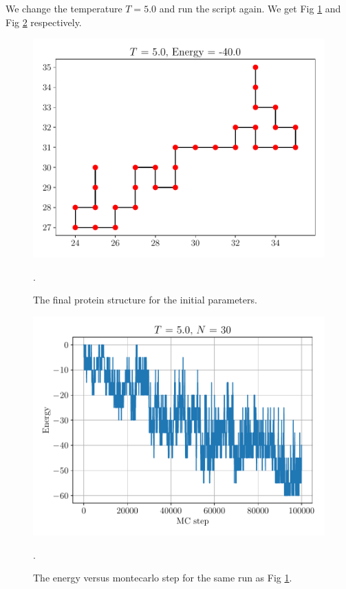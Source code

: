 \documentclass{article}
\begin{document}
We change the temperature $T =5.0$ and run the script again. We get Fig \ref{fig:q3a_protein5} and Fig \ref{fig:q3a_energy5} respectively. 
\begin{figure}[h!]
    \centerline{\includegraphics[scale=0.6]{images/Q3a_final_protein_T50_N30_n100000.pdf}}
    \caption{The final protein structure for the initial parameters. }.
    \label{fig:q3a_protein5}
\end{figure}
\begin{figure}[h!]
    \centerline{\includegraphics[scale=0.6]{images/Q3a_energy_vs_step_T50_N30_n100000.pdf}}
    \caption{The energy versus montecarlo step for the same run as Fig \ref{fig:q3a_protein5}. }.
    \label{fig:q3a_energy5}
\end{figure}
\end{document}
